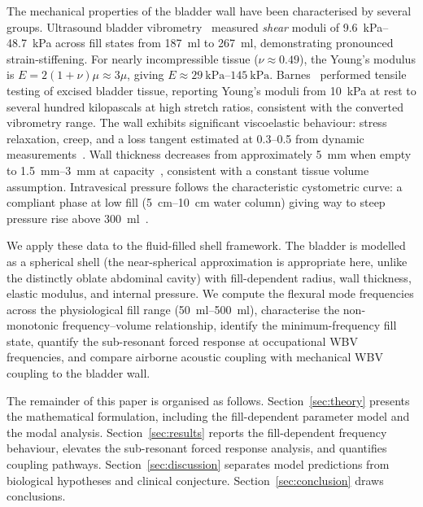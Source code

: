 The mechanical properties of the bladder wall have been characterised by
several groups.  Ultrasound bladder vibrometry~\cite{Nenadic2013} measured
\emph{shear} moduli of \SIrange{9.6}{48.7}{\kilo\pascal} across fill states from
\SI{187}{\milli\litre} to \SI{267}{\milli\litre}, demonstrating pronounced
strain-stiffening.  For nearly incompressible tissue ($\nu \approx 0.49$),
the Young's modulus is $E = 2(1+\nu)\mu \approx 3\mu$, giving
$E \approx \SIrange{29}{145}{\kilo\pascal}$.  Barnes~\cite{Barnes2016}
performed tensile testing of excised bladder tissue, reporting Young's moduli
from \SI{10}{\kilo\pascal} at rest to several hundred kilopascals at high
stretch ratios, consistent with the converted vibrometry range.  The wall exhibits
significant viscoelastic behaviour: stress relaxation, creep, and a loss
tangent estimated at 0.3--0.5 from dynamic
measurements~\cite{VanMastrigt1991}.  Wall thickness decreases from
approximately \SI{5}{\milli\metre} when empty to \SIrange{1.5}{3}{\milli\metre}
at capacity~\cite{Akkus2014}, consistent with a constant tissue volume
assumption.  Intravesical pressure follows the characteristic cystometric
curve: a compliant phase at low fill (\SIrange{5}{10}{\centi\metre}
water column) giving way to steep pressure rise above
\SI{300}{\milli\litre}~\cite{Griffiths1980}.

We apply these data to the fluid-filled shell framework.  The bladder is
modelled as a spherical shell (the near-spherical approximation is
appropriate here, unlike the distinctly oblate abdominal cavity) with
fill-dependent radius, wall thickness, elastic modulus, and internal pressure.
We compute the flexural mode frequencies across the physiological fill range
(\SIrange{50}{500}{\milli\litre}), characterise the non-monotonic
frequency--volume relationship, identify the minimum-frequency fill state,
quantify the sub-resonant forced response at occupational WBV frequencies,
and compare airborne acoustic coupling with mechanical WBV coupling to the
bladder wall.

The remainder of this paper is organised as follows.
Section~\ref{sec:theory} presents the mathematical formulation, including the
fill-dependent parameter model and the modal analysis.
Section~\ref{sec:results} reports the fill-dependent frequency behaviour,
elevates the sub-resonant forced response analysis, and quantifies coupling
pathways.
Section~\ref{sec:discussion} separates model predictions from biological
hypotheses and clinical conjecture.
Section~\ref{sec:conclusion} draws conclusions.
